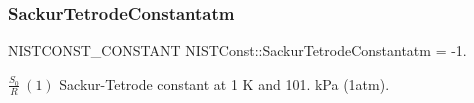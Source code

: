 \subsubsection{\texorpdfstring{Sackur\+Tetrode\+Constantatm}{SackurTetrodeConstantatm}}
{\footnotesize\ttfamily N\+I\+S\+T\+C\+O\+N\+S\+T\+\_\+\+C\+O\+N\+S\+T\+A\+NT N\+I\+S\+T\+Const\+::\+Sackur\+Tetrode\+Constantatm = -\/1.}

$\frac{S_0}{R} \ (1)$ Sackur-\/\+Tetrode constant at 1 K and 101. k\+Pa (1atm). 
